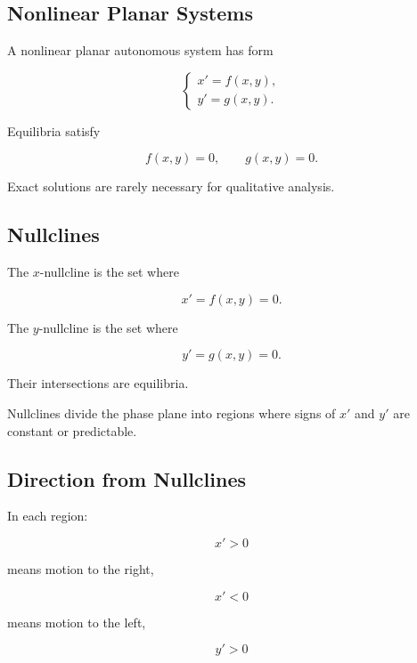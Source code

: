 \subsection{Nonlinear Planar Systems}
\label{subsec:nonlinear-planar-systems}

A nonlinear planar autonomous system has form

\[
\boxed{
\begin{cases}
x'=f(x,y),\\
y'=g(x,y).
\end{cases}
}
\]

Equilibria satisfy

\[
\boxed{
f(x,y)=0,
\qquad
g(x,y)=0.
}
\]

Exact solutions are rarely necessary for qualitative analysis.

\subsection{Nullclines}
\label{subsec:nullclines}

The \(x\)-nullcline is the set where

\[
\boxed{
x'=f(x,y)=0.
}
\]

The \(y\)-nullcline is the set where

\[
\boxed{
y'=g(x,y)=0.
}
\]

Their intersections are equilibria.

Nullclines divide the phase plane into regions where signs of \(x'\) and
\(y'\) are constant or predictable.

\subsection{Direction from Nullclines}
\label{subsec:nullcline-direction}

In each region:

\[
x'>0
\]

means motion to the right,

\[
x'<0
\]

means motion to the left,

\[
y'>0
\]


